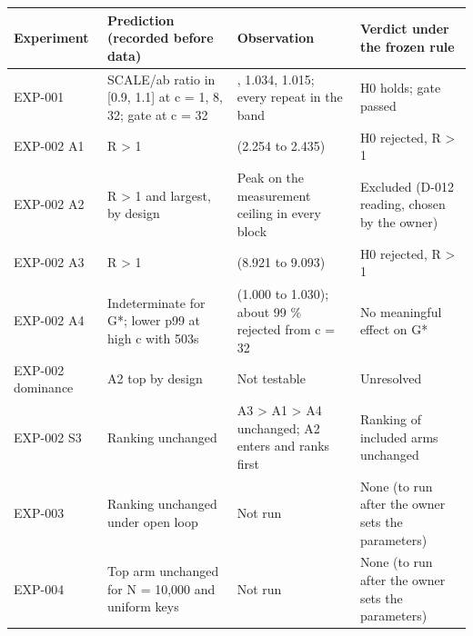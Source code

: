 \documentclass[
]{article}
\begin{document}
\begin{longtable}[]{@{}
  >{\raggedright\arraybackslash}p{}
  >{\raggedright\arraybackslash}p{}
  >{\raggedright\arraybackslash}p{}
  >{\raggedright\arraybackslash}p{}@{}}
\toprule\noalign{}
\begin{minipage}[b]{\linewidth}\raggedright
Experiment
\end{minipage} & \begin{minipage}[b]{\linewidth}\raggedright
Prediction (recorded before data)
\end{minipage} & \begin{minipage}[b]{\linewidth}\raggedright
Observation
\end{minipage} & \begin{minipage}[b]{\linewidth}\raggedright
Verdict under the frozen rule
\end{minipage} \\
\midrule\noalign{}
\endhead
\bottomrule\noalign{}
\endlastfoot
EXP-001 & SCALE/ab ratio in {[}0.9, 1.1{]} at c = 1, 8, 32; gate at c =
32 & 0.942, 1.034, 1.015; every repeat in the band & H0 holds; gate
passed \\
EXP-002 A1 & R \textgreater{} 1 & 2.337 (2.254 to 2.435) & H0 rejected,
R \textgreater{} 1 \\
EXP-002 A2 & R \textgreater{} 1 and largest, by design & Peak on the
measurement ceiling in every block & Excluded (D-012 reading, chosen by
the owner) \\
EXP-002 A3 & R \textgreater{} 1 & 9.005 (8.921 to 9.093) & H0 rejected,
R \textgreater{} 1 \\
EXP-002 A4 & Indeterminate for G*; lower p99 at high c with 503s & 1.015
(1.000 to 1.030); about 99 \% rejected from c = 32 & No meaningful
effect on G* \\
EXP-002 dominance & A2 top by design & Not testable & Unresolved \\
EXP-002 S3 & Ranking unchanged & A3 \textgreater{} A1 \textgreater{} A4
unchanged; A2 enters and ranks first & Ranking of included arms
unchanged \\
EXP-003 & Ranking unchanged under open loop & Not run & None (to run
after the owner sets the parameters) \\
EXP-004 & Top arm unchanged for N = 10,000 and uniform keys & Not run &
None (to run after the owner sets the parameters) \\
\end{longtable}
\end{document}
